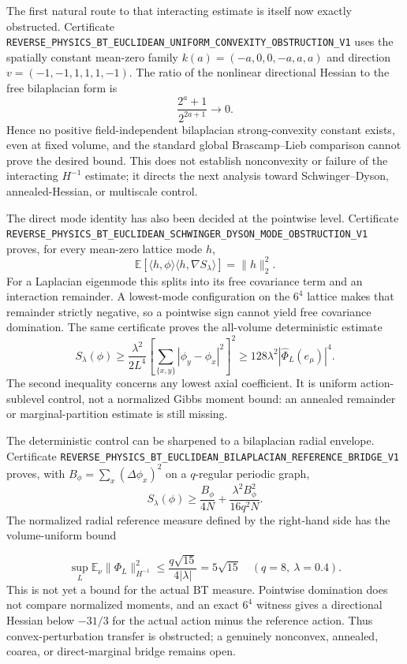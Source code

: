 \documentclass[11pt]{article}
\theoremstyle{definition}
\theoremstyle{remark}
\newcommand{\cert}[1]{\nolinkurl{#1}}
\begin{document}
The first natural route to that interacting estimate is itself now exactly
obstructed.  Certificate
\cert{REVERSE_PHYSICS_BT_EUCLIDEAN_UNIFORM_CONVEXITY_OBSTRUCTION_V1}
uses the spatially constant mean-zero family
\(k(a)=(-a,0,0,-a,a,a)\) and direction
\(v=(-1,-1,1,1,1,-1)\).  The ratio of the nonlinear directional Hessian to
the free bilaplacian form is
\[
                  \frac{2^a+1}{2^{2a+1}}\longrightarrow0.
\]
Hence no positive field-independent bilaplacian strong-convexity constant
exists, even at fixed volume, and the standard global Brascamp--Lieb
comparison cannot prove the desired bound.  This does not establish
nonconvexity or failure of the interacting \(H^{-1}\) estimate; it directs the
next analysis toward Schwinger--Dyson, annealed-Hessian, or multiscale
control.

The direct mode identity has also been decided at the pointwise level.
Certificate
\cert{REVERSE_PHYSICS_BT_EUCLIDEAN_SCHWINGER_DYSON_MODE_OBSTRUCTION_V1}
proves, for every mean-zero lattice mode \(h\),
\[
 \mathbb E[\langle h,\phi\rangle\langle h,\nabla S_\lambda\rangle]
 =\|h\|_2^2.
\]
For a Laplacian eigenmode this splits into its free covariance term and an
interaction remainder.  A lowest-mode configuration on the \(6^4\) lattice
makes that remainder strictly negative, so a pointwise sign cannot yield
free covariance domination.  The same certificate proves the all-volume
deterministic estimate
\[
 S_\lambda(\phi)\geq\frac{\lambda^2}{2L^4}
 \left[\sum_{\{x,y\}}|\phi_y-\phi_x|^2\right]^2
 \geq128\lambda^2|\widehat\Phi_L(e_\mu)|^4.
\]
The second inequality concerns any lowest axial coefficient.  It is uniform
action-sublevel control, not a normalized Gibbs moment bound: an annealed
remainder or marginal-partition estimate is still missing.

The deterministic control can be sharpened to a bilaplacian radial envelope.
Certificate
\cert{REVERSE_PHYSICS_BT_EUCLIDEAN_BILAPLACIAN_REFERENCE_BRIDGE_V1}
proves, with \(B_\phi=\sum_x(\Delta\phi_x)^2\) on a \(q\)-regular periodic
graph,
\[
 S_\lambda(\phi)\geq\frac{B_\phi}{4N}
       +\frac{\lambda^2B_\phi^2}{16q^2N}.
\]
The normalized radial reference measure defined by the right-hand side has
the volume-uniform bound

\[
 \sup_L\mathbb E_\nu\|\Phi_L\|_{H^{-1}}^2
 \leq\frac{q\sqrt{15}}{4|\lambda|}=5\sqrt{15}
 \quad(q=8,\ \lambda=0.4).
\]
This is not yet a bound for the actual BT measure.  Pointwise domination does
not compare normalized moments, and an exact \(6^4\) witness gives a
directional Hessian below \(-31/3\) for the actual action minus the reference
action.  Thus convex-perturbation transfer is obstructed; a genuinely
nonconvex, annealed, coarea, or direct-marginal bridge remains open.
\end{document}
